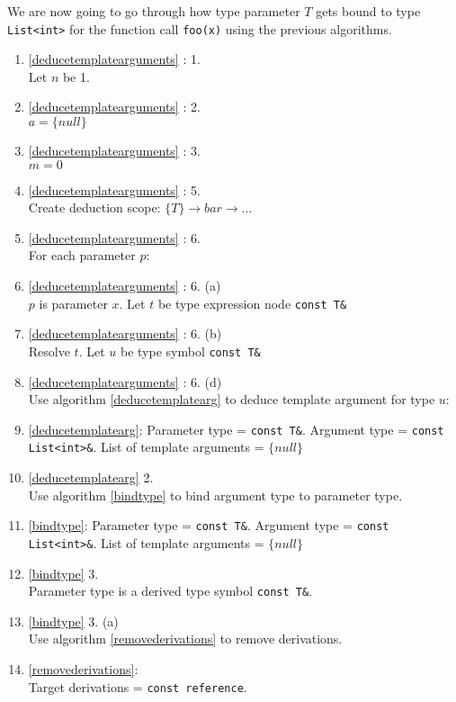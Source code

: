 \documentclass[a4paper,oneside,11pt]{book}
\theoremstyle{definition}
\begin{document}
We are now going to go through how type parameter $T$ gets bound to type \verb|List<int>| for the function call \verb|foo(x)|
using the previous algorithms.

\begin{enumerate}
\item
\ref{deducetemplatearguments} : 1.\\
Let $n$ be 1.
\item
\ref{deducetemplatearguments} : 2.\\
$a = \{null\}$
\item
\ref{deducetemplatearguments} : 3.\\
$m = 0$
\item
\ref{deducetemplatearguments} : 5.\\
Create deduction scope: $\{T\} \rightarrow bar \rightarrow \ldots$
\item
\ref{deducetemplatearguments} : 6.\\
For each parameter $p$:
\item
\ref{deducetemplatearguments} : 6. (a)\\
$p$ is parameter $x$.
Let $t$ be type expression node \verb|const T&|
\item
\ref{deducetemplatearguments} : 6. (b)\\
Resolve $t$.
Let $u$ be type symbol \verb|const T&|
\item
\ref{deducetemplatearguments} : 6. (d)\\
Use algorithm \ref{deducetemplatearg} to deduce template argument for type $u$:
\item
\ref{deducetemplatearg}:
Parameter type = \verb|const T&|.
Argument type = \verb|const List<int>&|.
List of template arguments = $\{null\}$
\item
\ref{deducetemplatearg} 2.\\
Use algorithm \ref{bindtype} to bind argument type to parameter type.
\item
\ref{bindtype}:
Parameter type = \verb|const T&|.
Argument type = \verb|const List<int>&|.
List of template arguments = $\{null\}$
\item
\ref{bindtype} 3.\\
Parameter type is a derived type symbol \verb|const T&|.
\item
\ref{bindtype} 3. (a)\\
Use algorithm \ref{removederivations} to remove derivations.
\item
\ref{removederivations}:\\
Target derivations = \verb|const reference|.

\end{enumerate}
\end{document}
